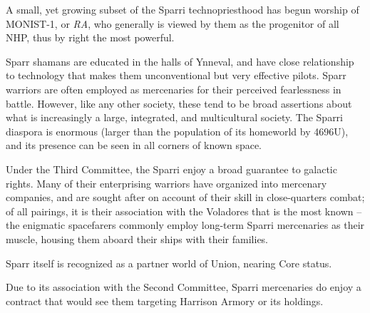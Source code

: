A small, yet growing subset of the Sparri technopriesthood has begun worship of MONIST-1, or
\textit{RA}, who generally is viewed by them as the progenitor of all NHP, thus by right the most powerful.

Sparr shamans are educated in the halls of Ynneval, and have close relationship to technology
that makes them unconventional but very effective pilots. Sparr warriors are often employed as
mercenaries for their perceived fearlessness in battle. However, like any other society, these tend
to be broad assertions about what is increasingly a large, integrated, and multicultural society.
The Sparri diaspora is enormous (larger than the population of its homeworld by 4696U), and its
presence can be seen in all corners of known space.

Under the Third Committee, the Sparri enjoy a broad guarantee to galactic rights. Many of their
enterprising warriors have organized into mercenary companies, and are sought after on account
of their skill in close-quarters combat; of all pairings, it is their association with the Voladores that
is the most known -- the enigmatic spacefarers commonly employ long-term Sparri mercenaries
as their muscle, housing them aboard their ships with their families.

Sparr itself is recognized as a partner world of Union, nearing Core status.

Due to its association with the Second Committee, Sparri mercenaries do enjoy a contract that
would see them targeting Harrison Armory or its holdings.